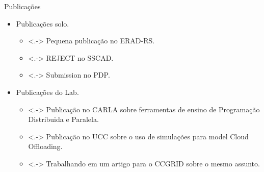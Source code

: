 \documentclass{beamer}
\begin{document}
\begin{frame}{Publicações}

  \begin{itemize}
    \item<+-> Publicações solo.
    \begin{itemize}
      \item<.-> Pequena publicação no ERAD-RS.
      \item<.-> REJECT no SSCAD.
      \item<.-> Submission no PDP.
    \end{itemize}
    \item<+-> Publicações do Lab.
    \begin{itemize}
      \item<.-> Publicação no CARLA sobre ferramentas de ensino de Programação Distribuida e Paralela.
      \item<.-> Publicação no UCC sobre o uso de simulações para model Cloud Offloading.
      \item<.-> Trabalhando em um artigo para o CCGRID sobre o mesmo assunto.
    \end{itemize}
  \end{itemize}
\end{frame}



\backmatter
\end{document}
